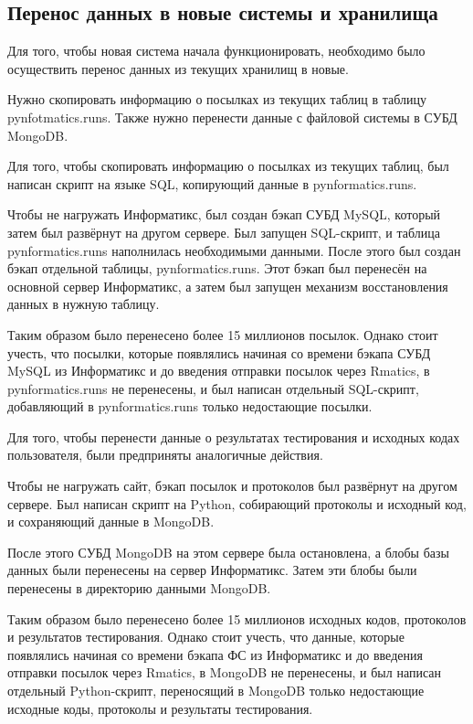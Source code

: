 \subsection{Перенос данных в новые системы и хранилища}

\label{chap:move_data}
Для того, чтобы новая система начала функционировать,
необходимо было осуществить перенос данных из текущих хранилищ в новые.

Нужно скопировать информацию о посылках из текущих таблиц в таблицу pynfotmatics.runs. 
Также нужно перенести данные с файловой системы в СУБД MongoDB.

Для того, чтобы скопировать информацию о посылках из текущих таблиц, 
был написан скрипт на языке SQL, копирующий данные в pynformatics.runs.

Чтобы не нагружать Информатикс, был создан бэкап СУБД MySQL,
который затем был развёрнут на другом сервере. 
Был запущен SQL-скрипт, и таблица pynformatics.runs наполнилась необходимыми данными.
После этого был создан бэкап отдельной таблицы, pynformatics.runs.
Этот бэкап был перенесён на основной сервер Информатикс, а затем был запущен механизм восстановления данных в нужную таблицу.

Таким образом было перенесено более 15 миллионов посылок.
Однако стоит учесть, что посылки, которые появлялись начиная со времени бэкапа СУБД MySQL из Информатикс и до введения отправки посылок через Rmatics,
в pynformatics.runs не перенесены, и был написан отдельный SQL-скрипт,
добавляющий в pynformatics.runs только недостающие посылки.

Для того, чтобы перенести данные о результатах тестирования и исходных кодах пользователя, 
были предприняты аналогичные действия.

Чтобы не нагружать сайт, бэкап посылок и протоколов был развёрнут на другом сервере.
Был написан скрипт на Python, собирающий протоколы и исходный код, 
и сохраняющий данные в MongoDB. 

После этого СУБД MongoDB на этом сервере была остановлена, 
а блобы базы данных были перенесены на сервер Информатикс.
Затем эти блобы были перенесены в директорию данными MongoDB.

Таким образом было перенесено более 15 миллионов исходных кодов, протоколов и результатов тестирования.
Однако стоит учесть, что данные, которые появлялись начиная со времени бэкапа ФС из Информатикс и до введения отправки посылок через Rmatics,
в MongoDB не перенесены, и был написан отдельный Python-скрипт,
переносящий в MongoDB только недостающие исходные коды, протоколы и результаты тестирования.

